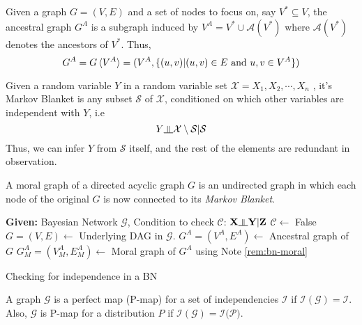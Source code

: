 \begin{defn}
Given a graph $G = (V,E)$ and a set of nodes to focus on, say $V^* \subseteq V$, the ancestral graph ${G}^A$ is a subgraph induced by $V^A = V^* \cup \mathcal{A}(V^*)$ where $\mathcal{A}(V^*)$ denotes the ancestors of $V^*$. Thus,
\begin{equation}
G^A = G\braket{V^A} = (V^A, \{(u,v) | (u, v) \in E \text{ and } u, v \in V^A\})
\end{equation}
\begin{defn}
Given a random variable $Y$ in a random variable set $\mathcal X = {X_1, X_2, \cdots, X_n}$ , it's Markov Blanket is any subset $\mathcal S$ of $\mathcal X$, conditioned on which other variables are independent with $Y$, i.e
\begin{equation}
Y \ind \mathcal{X}\setminus\mathcal{S} | \mathcal S
\end{equation}
Thus, we can infer $Y$ from $\mathcal S$ itself, and the rest of the elements are redundant in observation.
\end{defn}
\end{defn}
\begin{defn}
A moral graph of a directed acyclic graph $G$ is an undirected graph in which each node of the original $G$ is now connected to its \textit{Markov Blanket}.
\end{defn}
\begin{algorithm}[H]\label{alg:bn-moral}
	\DontPrintSemicolon
	\textbf{Given:} Bayesian Network $\mathcal G$, Condition to check $\mathcal{C}$: $\mathbf X \ind \mathbf Y | \mathbf Z$ \;
	$\mathcal C \leftarrow$ False\;
	$G = (V,E) \leftarrow$ Underlying DAG in $\mathcal G$. \;
	$G^A = (V^A, E^A) \leftarrow$ Ancestral graph of $G$ \;
	$G^A_M = (V^A_M, E^A_M)\leftarrow$ Moral graph of $G^A$ using Note \ref{rem:bn-moral} \;
	\;
	\caption{Checking for independence in a BN}
\end{algorithm}
\begin{defn}
A graph $\mathcal G$ is a perfect map (P-map) for a set of independencies $\mathcal I$ if $\mathcal{I(G)} = \mathcal I$. Also, $\mathcal G$ is P-map for a distribution $P$ if $\mathcal{I(G) = I(P})$.
\end{defn}
